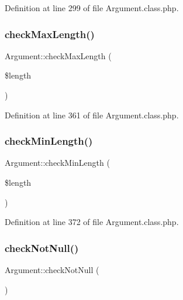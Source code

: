 Definition at line 299 of file Argument.\+class.\+php.

\hypertarget{classArgument_acc5f170121988acf71c50e5941320112}{}\label{classArgument_acc5f170121988acf71c50e5941320112} 
\subsubsection{\texorpdfstring{check\+Max\+Length()}{checkMaxLength()}}
{\footnotesize\ttfamily Argument\+::check\+Max\+Length (\begin{DoxyParamCaption}\item[{}]{\$length }\end{DoxyParamCaption})}



Definition at line 361 of file Argument.\+class.\+php.

\hypertarget{classArgument_ac44c716b86dc42d5c0f0e4717a510c74}{}\label{classArgument_ac44c716b86dc42d5c0f0e4717a510c74} 
\subsubsection{\texorpdfstring{check\+Min\+Length()}{checkMinLength()}}
{\footnotesize\ttfamily Argument\+::check\+Min\+Length (\begin{DoxyParamCaption}\item[{}]{\$length }\end{DoxyParamCaption})}



Definition at line 372 of file Argument.\+class.\+php.

\hypertarget{classArgument_a09edcec0bf4dbfeedec2f7652e44e57d}{}\label{classArgument_a09edcec0bf4dbfeedec2f7652e44e57d} 
\subsubsection{\texorpdfstring{check\+Not\+Null()}{checkNotNull()}}
{\footnotesize\ttfamily Argument\+::check\+Not\+Null (\begin{DoxyParamCaption}{ }\end{DoxyParamCaption})}



